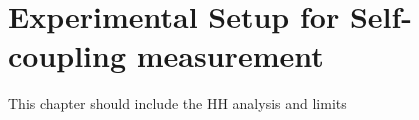 \newpage
\chapter{Experimental Setup for Self-coupling measurement}
\label{Ana}

This chapter should include the HH analysis and \kl limits